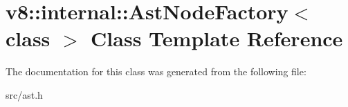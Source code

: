 \hypertarget{classv8_1_1internal_1_1_ast_node_factory}{}\section{v8\+:\+:internal\+:\+:Ast\+Node\+Factory$<$ class $>$ Class Template Reference}
\label{classv8_1_1internal_1_1_ast_node_factory}


The documentation for this class was generated from the following file\+:\begin{DoxyCompactItemize}
\item 
src/ast.\+h\end{DoxyCompactItemize}
